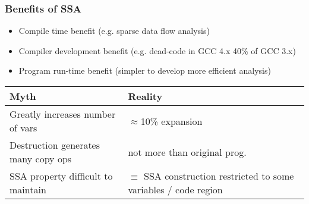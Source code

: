 \begin{frame}
\frametitle{Benefits of SSA}
\begin{itemize}
\item Compile time benefit (e.g. sparse data flow analysis)
\item Compiler development benefit (e.g. dead-code in GCC 4.x 40\% of GCC 3.x)
\item Program run-time benefit (simpler to develop more efficient analysis)
\end{itemize}
\begin{center}
\small
\begin{tabular}{p{}@{\kern.1\textwidth}p{}}
\hfil Myth\hfil & \hfil Reality \hfil \\ \hline
Greatly increases number of vars & $\approx$10\% expansion\\ [1ex]
Destruction generates many copy ops & not more than original prog. \\ [1ex]
SSA property difficult to maintain & $\equiv$ SSA construction restricted to some variables / code region 
\end{tabular}
\end{center}
\end{frame}


